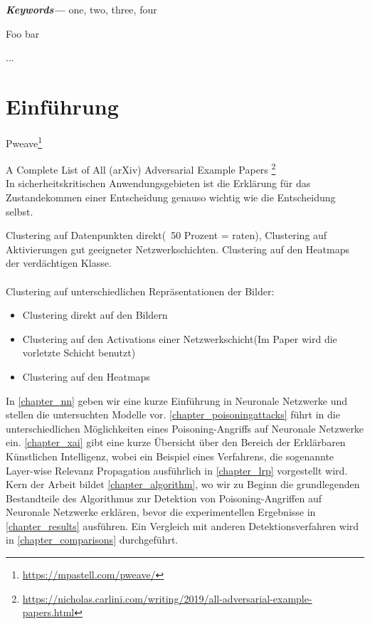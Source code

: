\documentclass[twoside, 11pt,a4paper]{article}
\providecommand{\keywords}[1]
{
	\small	
	\textbf{\textit{Keywords---}} #1
}
\numberwithin{equation}{section}
\begin{document}
	\keywords{one, two, three, four}
	\newpage
	\listoffigures
	
	\listoftables
	
	\lstlistoflistings
	
	\listofalgorithms
	\newpage
	\tableofcontents
	\newpage
	

	
	
	\begin{algorithm} 
		\caption{Foo bar} 
		... 
	\end{algorithm} 
	\section{Einführung}
	
	Pweave\footnote{\url{https://mpastell.com/pweave/}}
	
	A Complete List of All (arXiv) Adversarial Example Papers \footnote{\url{https://nicholas.carlini.com/writing/2019/all-adversarial-example-papers.html}}
	\\
	In sicherheitskritischen Anwendungsgebieten ist die Erklärung für das Zustandekommen einer Entscheidung genauso wichtig wie die Entscheidung selbst\cite{LRP_DNN}.
	
	Clustering auf Datenpunkten direkt(~50 Prozent = raten), Clustering auf Aktivierungen gut geeigneter Netzwerkschichten. Clustering auf den Heatmaps der verdächtigen Klasse.\\
	\\
	
	Clustering auf unterschiedlichen Repräsentationen der Bilder:
	\begin{itemize}
		\item Clustering direkt auf den Bildern\\
		\item Clustering auf den Activations einer Netzwerkschicht(Im Paper \cite{AC} wird die vorletzte Schicht benutzt)
		\item Clustering auf den Heatmaps
	\end{itemize}
	In \autoref{chapter_nn} geben wir eine kurze Einführung in Neuronale Netzwerke und stellen die untersuchten Modelle vor. \autoref{chapter_poisoningattacks} führt in die unterschiedlichen Möglichkeiten eines Poisoning-Angriffs auf Neuronale Netzwerke ein. \autoref{chapter_xai} gibt eine kurze Übersicht über den Bereich der Erklärbaren Künstlichen Intelligenz, wobei ein Beispiel eines Verfahrens, die sogenannte Layer-wise Relevanz Propagation ausführlich in \autoref{chapter_lrp} vorgestellt wird. Kern der Arbeit bildet \autoref{chapter_algorithm}, wo wir zu Beginn die grundlegenden Bestandteile des Algorithmus zur Detektion von Poisoning-Angriffen auf Neuronale Netzwerke erklären, bevor die experimentellen Ergebnisse in \autoref{chapter_results} ausführen. Ein Vergleich mit anderen Detektionsverfahren wird in \autoref{chapter_comparisons} durchgeführt.
\end{document}
